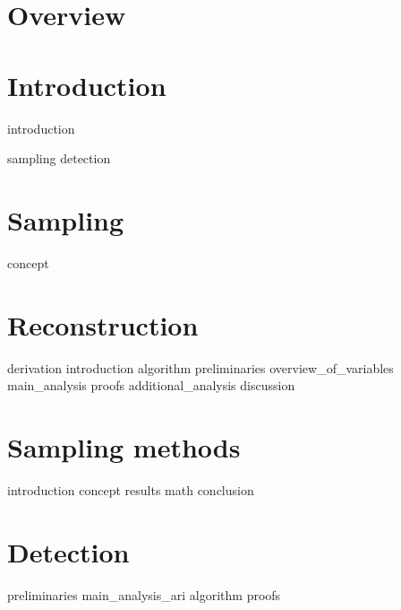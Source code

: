 \documentclass[a4paper, openany, oneside]{memoir}
\begin{document}
\chapter{Overview}

\chapter{Introduction}
{introduction}

{sampling}
{detection}


\chapter{Sampling}

{concept}

\chapter{Reconstruction}

{derivation}
{introduction}
{algorithm}
{preliminaries}
{overview_of_variables}
{main_analysis}
{proofs}
{additional_analysis}
{discussion}

\chapter{Sampling methods}

{introduction}
{concept}
{results}
{math} 
{conclusion}


\chapter{Detection}

{preliminaries}
{main_analysis_ari}
{algorithm}
{proofs}
\end{document}

